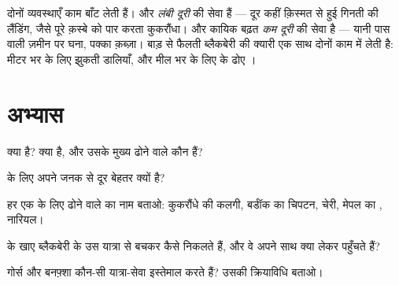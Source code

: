 \begin{remark}[दो रफ़्तारों का उपनिवेशन]\label{rem:g6:how-plants-spread:twospeeds}
दोनों व्यवस्थाएँ काम बाँट लेती हैं।  और  \emph{लंबी दूरी} की
सेवा हैं --- दूर कहीं क़िस्मत से हुई गिनती की लैंडिंग, जैसे पूरे क़स्बे
को पार करता कुकरौंधा। और कायिक बढ़त \emph{कम दूरी} की सेवा है --- यानी
पास वाली ज़मीन पर घना, पक्का क़ब्ज़ा। बाड़ से फैलती ब्लैकबेरी की क्यारी
एक साथ दोनों काम में लेती है: मीटर भर के लिए झुकती डालियाँ, और मील भर
के लिए  के ढोए ।
\end{remark}

\section{अभ्यास}

\begin{exercise}[$\star$]\label{exo:g6:how-plants-spread:1}
 क्या है?  क्या है, और उसके मुख्य ढोने वाले कौन हैं?
\end{exercise}

\begin{exercise}[$\star$]\label{exo:g6:how-plants-spread:2}
 के लिए अपने जनक से दूर  बेहतर क्यों है?
\end{exercise}

\begin{exercise}[$\star$]\label{exo:g6:how-plants-spread:3}
हर एक के लिए ढोने वाले का नाम बताओ: कुकरौंधे की कलगी, बर्डॉक का चिपटन,
चेरी, मेपल का , नारियल।
\end{exercise}

\begin{exercise}[$\star$]\label{exo:g6:how-plants-spread:4}
 के खाए ब्लैकबेरी के  उस यात्रा से बचकर कैसे निकलते हैं, और वे
अपने साथ क्या लेकर पहुँचते हैं?
\end{exercise}

\begin{exercise}[$\star$]\label{exo:g6:how-plants-spread:5}
गोर्स और बनफ़्शा कौन-सी यात्रा-सेवा इस्तेमाल करते हैं? उसकी क्रियाविधि
बताओ।
\end{exercise}

